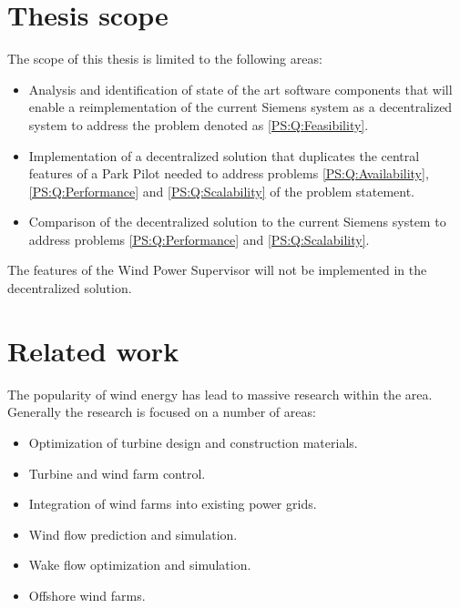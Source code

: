 \section{Thesis scope}
\label{sec:thesisScope}
The scope of this thesis is limited to the following areas:

\begin{itemize}
	\item Analysis and identification of state of the art software components that will enable a reimplementation of the current Siemens system as a decentralized system to address the problem denoted as \ref{PS:Q:Feasibility}.
	\item Implementation of a decentralized solution that duplicates the central features of a Park Pilot needed to address problems \ref{PS:Q:Availability}, \ref{PS:Q:Performance} and \ref{PS:Q:Scalability} of the problem statement.
	\item Comparison of the decentralized solution to the current Siemens system to address problems \ref{PS:Q:Performance} and \ref{PS:Q:Scalability}.
\end{itemize}

The features of the Wind Power Supervisor will not be implemented in the decentralized solution.

\section{Related work}
The popularity of wind energy has lead to massive research within the area. Generally the research is focused on a number of areas:

\begin{itemize}
	\item Optimization of turbine design and construction materials.
	\item Turbine and wind farm control.
	\item Integration of wind farms into existing power grids.
	\item Wind flow prediction and simulation.
	\item Wake flow optimization and simulation.
	\item Offshore wind farms.
\end{itemize}

%

